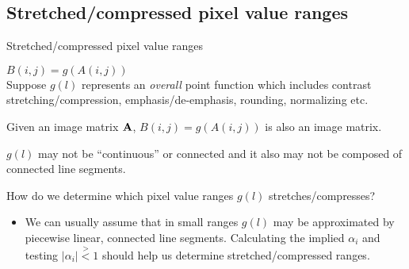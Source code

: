 \subsection{Stretched/compressed pixel value ranges}
%
%
\begin{slide}{Stretched/compressed pixel value ranges}
\begin{titlelist}{}{}

\item<2-> $B(i,j)=g(A(i,j))$\\
Suppose $g(l)$ represents an {\em overall} point function which
includes contrast stretching/compression, emphasis/de-emphasis, rounding,
normalizing etc.

\item<3-> Given an image matrix ${\bf A}$, $B(i,j)=g(A(i,j))$ is also
an image matrix.

\item<4-> $g(l)$ may not be ``continuous'' or connected and it also
may not be composed of connected line segments.

\item<5-> How do we determine which pixel value ranges $g(l)$ 
stretches/compresses?
\begin{itemize}
\item<6-> 
We can usually assume that in small ranges $g(l)$ may be
approximated by piecewise linear, connected line segments.
Calculating the implied $\alpha_i$ and testing $|\alpha_i| \stackrel{>}{<} 1$
should help us determine stretched/compressed ranges.
\end{itemize}

\end{titlelist}

\end{slide}


